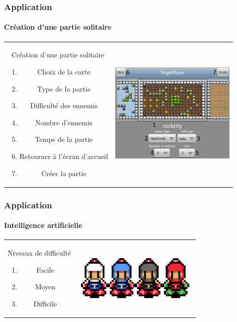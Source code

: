 	\begin{frame}
	\frametitle{Application}
	\framesubtitle{Création d'une partie solitaire}
	
		\begin{tabular}{cc}
			\begin{minipage}{5cm}
				Création d'une partie solitaire
				\begin{enumerate}
					\item Choix de la carte
					\item Type de la partie
					\item Difficulté des ennemis
					\item Nombre d'ennemis
					\item Temps de la partie
					\item Retourner à l'écran d'accueil
					\item Créer la partie
				\end{enumerate}
			\end{minipage} &
			\begin{minipage}{7cm}
				\includegraphics[width=6cm]{img/singleplayerbis.png} 
			\end{minipage}\\
		\end{tabular}
	
	\end{frame}
	

	\begin{frame}
	\frametitle{Application}
	\framesubtitle{Intelligence artificielle}
	
		\begin{tabular}{cc}
			\begin{minipage}{4cm}
				Niveaux de difficulté
				\begin{enumerate}
					\item Facile
					\item Moyen
					\item Difficile
				\end{enumerate}
			\end{minipage} &
			\begin{minipage}{6cm}
				\includegraphics[width=6cm]{img/bots.png} 
			\end{minipage}\\
		\end{tabular}
	
	\end{frame}
	
